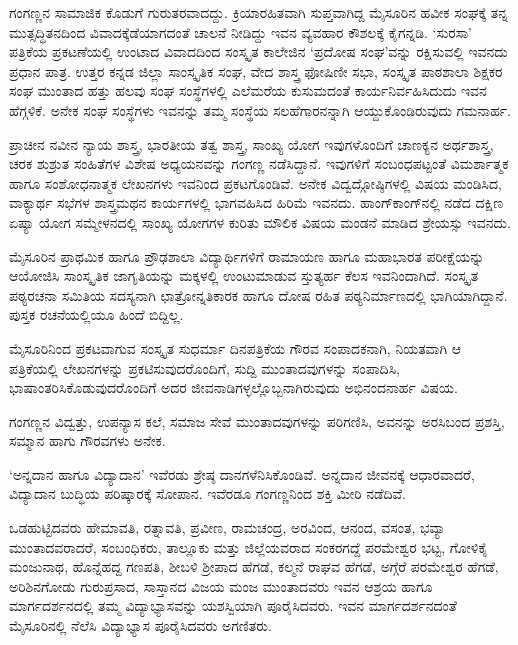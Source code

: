 {ಗಂಗಣ್ಣನ ಸಾಮಾಜಿಕ ಕೊಡುಗೆ ಗುರುತರವಾದದ್ದು. ಕ್ರಿಯಾರಹಿತವಾಗಿ ಸುಪ್ತವಾಗಿದ್ದ ಮೈಸೂರಿನ ಹವೀಕ ಸಂಘಕ್ಕೆ ತನ್ನ ಮುತ್ಸದ್ಧಿತನದಿಂದ ವಿವಾದಕ್ಕೆಡೆಯಾಗದಂತೆ ಚಾಲನೆ ನೀಡಿದ್ದು ಇವನ ವ್ಯವಹಾರ ಕೌಶಲಕ್ಕೆ ಕೈಗನ್ನಡಿ. ‘ಸುರಸಾ’  \enginline{-}  ಪತ್ರಿಕೆಯ ಪ್ರಕಟಣೆಯಲ್ಲಿ ಉಂಟಾದ ವಿವಾದದಿಂದ ಸಂಸ್ಕೃತ ಕಾಲೇಜಿನ ‘ಪ್ರದೋಷ ಸಂಘ’ವನ್ನು ರಕ್ಷಿಸುವಲ್ಲಿ ಇವನದು ಪ್ರಧಾನ ಪಾತ್ರ. ಉತ್ತರ ಕನ್ನಡ ಜಿಲ್ಲಾ ಸಾಂಸ್ಕೃತಿಕ ಸಂಘ, ವೇದ ಶಾಸ್ತ್ರ  ಫೋಷಿಣೀ ಸಭಾ, ಸಂಸ್ಕೃತ ಪಾಠಶಾಲಾ ಶಿಕ್ಷಕರ ಸಂಘ ಮುಂತಾದ ಹತ್ತು ಹಲವು ಸಂಘ  \enginline{-}  ಸಂಸ್ಥೆಗಳಲ್ಲಿ ಎಲೆಮರೆಯ ಕುಸುಮದಂತೆ ಕಾರ್ಯನಿರ್ವಹಿಸಿದುದು ಇವನ ಹೆಗ್ಗಳಿಕೆ. ಅನೇಕ ಸಂಘ  \enginline{-}  ಸಂಸ್ಥೆಗಳು ಇವನನ್ನು ತಮ್ಮ ಸಂಸ್ಥೆಯ ಸಲಹೆಗಾರನನ್ನಾಗಿ ಆಯ್ದುಕೊಂಡಿರುವುದು ಗಮನಾರ್ಹ.

ಪ್ರಾಚೀನ  \enginline{-}  ನವೀನ ನ್ಯಾಯ ಶಾಸ್ತ್ರ, ಭಾರತೀಯ ತತ್ವ ಶಾಸ್ತ್ರ, ಸಾಂಖ್ಯ  \enginline{-}  ಯೋಗ ಇವುಗಳೊಂದಿಗೆ ಚಾಣಕ್ಯನ ಅರ್ಥಶಾಸ್ತ್ರ, ಚರಕ  \enginline{-}  ಶುಶ್ರುತ ಸಂಹಿತೆಗಳ ವಿಶೇಷ ಅಧ್ಯಯನವನ್ನು ಗಂಗಣ್ಣ ನಡೆಸಿದ್ದಾನೆ. ಇವುಗಳಿಗೆ ಸಂಬಂಧಪಟ್ಟಂತೆ ವಿಮರ್ಶಾತ್ಮಕ ಹಾಗೂ ಸಂಶೋಧನಾತ್ಮಕ ಲೇಖನಗಳು ಇವನಿಂದ ಪ್ರಕಟಗೊಂಡಿವೆ. ಅನೇಕ ವಿದ್ವದ್ಗೋಷ್ಠಿಗಳಲ್ಲಿ ವಿಷಯ ಮಂಡಿಸಿದ, ವಾಕ್ಯಾರ್ಥ ಸಭೆಗಳ ಶಾಸ್ತ್ರಮಥನ ಕಾರ್ಯಗಳಲ್ಲಿ ಭಾಗವಹಿಸಿದ ಹಿರಿಮೆ ಇವನದು. ಹಾಂಗ್‍ಕಾಂಗ್‍ನಲ್ಲಿ ನಡೆದ ದಕ್ಷಿಣ ಏಷ್ಯಾ ಯೋಗ ಸಮ್ಮೇಳನದಲ್ಲಿ ಸಾಂಖ್ಯ  \enginline{-}  ಯೋಗಗಳ ಕುರಿತು ಮೌಲಿಕ ವಿಷಯ ಮಂಡನೆ ಮಾಡಿದ ಶ್ರೇಯಸ್ಸು ಇವನದು. 

ಮೈಸೂರಿನ ಪ್ರಾಥಮಿಕ ಹಾಗೂ ಪ್ರೌಢಶಾಲಾ ವಿದ್ಯಾರ್ಥಿಗಳಿಗೆ ರಾಮಾಯಣ ಹಾಗೂ ಮಹಾಭಾರತ ಪರೀಕ್ಷೆಯನ್ನು ಆಯೋಜಿಸಿ ಸಾಂಸ್ಕೃತಿಕ ಜಾಗೃತಿಯನ್ನು ಮಕ್ಕಳಲ್ಲಿ ಉಂಟುಮಾಡುವ ಸ್ತುತ್ಯರ್ಹ ಕೆಲಸ ಇವನಿಂದಾಗಿದೆ. ಸಂಸ್ಕೃತ ಪಠ್ಯರಚನಾ ಸಮಿತಿಯ ಸದಸ್ಯನಾಗಿ ಛಾತ್ರೋನ್ನತಿಕಾರಕ ಹಾಗೂ ದೋಷ ರಹಿತ ಪಠ್ಯನಿರ್ಮಾಣದಲ್ಲಿ ಭಾಗಿಯಾಗಿದ್ದಾನೆ. ಪುಸ್ತಕ ರಚನೆಯಲ್ಲಿಯೂ ಹಿಂದೆ ಬಿದ್ದಿಲ್ಲ.

ಮೈಸೂರಿನಿಂದ ಪ್ರಕಟವಾಗುವ ಸಂಸ್ಕೃತ ಸುಧರ್ಮಾ ದಿನಪತ್ರಿಕೆಯ ಗೌರವ ಸಂಪಾದಕನಾಗಿ, ನಿಯತವಾಗಿ ಆ ಪತ್ರಿಕೆಯಲ್ಲಿ ಲೇಖನಗಳನ್ನು ಪ್ರಕಟಿಸುವುದರೊಂದಿಗೆ, ಸುದ್ದಿ ಮುಂತಾದವುಗಳನ್ನು ಸಂಪಾದಿಸಿ, ಭಾಷಾಂತರಿಸಿಕೊಡುವುದರೊಂದಿಗೆ ಅದರ ಜೀವನಾಡಿಗಳ್ಳಲ್ಲೊಬ್ಬನಾಗಿರುವುದು ಅಭಿನಂದನಾರ್ಹ ವಿಷಯ.

ಗಂಗಣ್ಣನ ವಿದ್ವತ್ತು, ಉಪನ್ಯಾಸ ಕಲೆ, ಸಮಾಜ ಸೇವೆ ಮುಂತಾದವುಗಳನ್ನು ಪರಿಗಣಿಸಿ, ಅವನನ್ನು ಅರಸಿಬಂದ ಪ್ರಶಸ್ತಿ, ಸಮ್ಮಾನ ಹಾಗು ಗೌರವಗಳು ಅನೇಕ.

‘ಅನ್ನದಾನ ಹಾಗೂ ವಿದ್ಯಾದಾನ’   \enginline{-}   ಇವೆರಡು ಶ್ರೇಷ್ಠ ದಾನಗಳೆನಿಸಿಕೊಂಡಿವೆ. ಅನ್ನದಾನ ಜೀವನಕ್ಕೆ ಆಧಾರವಾದರೆ, ವಿದ್ಯಾದಾನ ಬುದ್ಧಿಯ ಪರಿಷ್ಕಾರಕ್ಕೆ ಸೋಪಾನ. ಇವೆರಡೂ ಗಂಗಣ್ಣನಿಂದ ಶಕ್ತಿ ಮೀರಿ ನಡೆದಿವೆ. 

ಒಡಹುಟ್ಟಿದವರು ಹೇಮಾವತಿ, ರತ್ನಾವತಿ, ಪ್ರವೀಣ, ರಾಮಚಂದ್ರ, ಅರವಿಂದ, ಆನಂದ, ವಸಂತ, ಭವ್ಯಾ ಮುಂತಾದವರಾದರೆ, ಸಂಬಂಧಿಕರು, ತಾಲ್ಲೂಕು ಮತ್ತು ಜಿಲ್ಲೆಯವರಾದ ಸಂಕರಗದ್ದೆ ಪರಮೇಶ್ವರ ಭಟ್ಟ, ಗೋಳಿಕೈ ಮಂಜುನಾಥ, ಹೊನ್ನೆಹದ್ದ ಗಣಪತಿ, ಶೀಬಳಿ ಶ್ರೀಪಾದ ಹೆಗಡೆ, ಕಲ್ಮನೆ ರಾಘವ ಹೆಗಡೆ, ಅಗ್ಗೆರೆ ಪರಮೇಶ್ವರ ಹೆಗಡೆ, ಅರಿಶಿನಗೋಡು ಗುರುಪ್ರಸಾದ, ಸಾಸ್ತಾನದ ವಿಜಯ ಮಂಜ ಮುಂತಾದವರು ಇವನ ಆಶ್ರಯ ಹಾಗೂ ಮಾರ್ಗದರ್ಶನದಲ್ಲಿ ತಮ್ಮ ವಿದ್ಯಾಭ್ಯಾಸವನ್ನು ಯಶಸ್ವಿಯಾಗಿ ಪೂರೈಸಿದವರು. ಇವನ ಮಾರ್ಗದರ್ಶನದಂತೆ ಮೈಸೂರಿನಲ್ಲಿ ನೆಲೆಸಿ ವಿದ್ಯಾಭ್ಯಾಸ ಪೂರೈಸಿದವರು ಅಗಣಿತರು.

}
